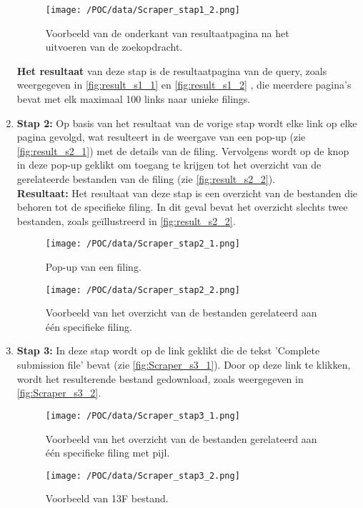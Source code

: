 \begin{enumerate}
    \begin{figure}[H]
        \centering        
        \texttt{[image: /POC/data/Scraper\_stap1\_2.png]}
        \caption{Voorbeeld van de onderkant van resultaatpagina na het uitvoeren van de zoekopdracht.}
        \label{fig:result_s1_2}
    \end{figure}
     \textbf{Het resultaat} van deze stap is de resultaatpagina van de query, zoals weergegeven in \autoref{fig:result_s1_1} en \autoref{fig:result_s1_2} , die meerdere pagina's bevat met elk maximaal 100 links naar unieke filings.\\
    \item \textbf{Stap 2:} Op basis van het resultaat van de vorige stap wordt elke link op elke pagina gevolgd, wat resulteert in de weergave van een pop-up (zie \autoref{fig:result_s2_1}) met de details van de filing. Vervolgens wordt op de knop in deze pop-up geklikt om toegang te krijgen tot het overzicht van de gerelateerde bestanden van de filing (zie \autoref{fig:result_s2_2}).\\
    \textbf{Resultaat:} Het resultaat van deze stap is een overzicht van de bestanden die behoren tot de specifieke filing. In dit geval bevat het overzicht slechts twee bestanden, zoals geïllustreerd in \autoref{fig:result_s2_2}.

  
    \begin{figure}[H]
        \centering        
        \texttt{[image: /POC/data/Scraper\_stap2\_1.png]}
        \caption{Pop-up van een filing.}
        \label{fig:result_s2_1}
    \end{figure}
    
    \begin{figure}[H]
        \centering        
        \texttt{[image: /POC/data/Scraper\_stap2\_2.png]}
        \caption{Voorbeeld van het overzicht van de bestanden gerelateerd aan één specifieke filing.}
        \label{fig:result_s2_2}
    \end{figure}
    
    \item \textbf{Stap 3:} In deze stap wordt op de link geklikt die de tekst 'Complete submission file' bevat (zie \autoref{fig:Scraper_s3_1}). Door op deze link te klikken, wordt het resulterende bestand gedownload, zoals weergegeven in \autoref{fig:Scraper_s3_2}.
       \begin{figure}[H]
        \centering        
        \texttt{[image: /POC/data/Scraper\_stap3\_1.png]}
        \caption{Voorbeeld van het overzicht van de bestanden gerelateerd aan één specifieke filing met pijl.}
        \label{fig:result_s3_1}
    \end{figure}
    
    \begin{figure}[H]
        \centering        
        \texttt{[image: /POC/data/Scraper\_stap3\_2.png]}
        \caption{Voorbeeld van 13F bestand.}
        \label{fig:result_s3_2}
    \end{figure}
    
\end{enumerate}

